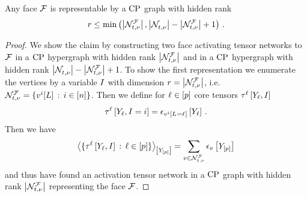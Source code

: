 \begin{lemma}
    \label{lem:CPfaceRepresentationBound} %
    Any face $\mathcal{F}$ is representable by a $\mathrm{CP}$ graph with hidden rank
    \begin{align*}
        r
        \leq \min\left(\left|\mathcal{N}_{t,\nu}^{\mathcal{F}}\right|,\left|\mathcal{N}_{t,\nu}^{}\right|-\left|\mathcal{N}_{t,\nu}^{\mathcal{F}}\right|+1\right) \, .
    \end{align*}
\end{lemma}
\begin{proof}
    We show the claim by constructing two face activating tensor networks to $\mathcal{F}$ in a $\mathrm{CP}$ hypergraph with hidden rank $\left|\mathcal{N}_{t,\nu}^{\mathcal{F}}\right|$ and in a $\mathrm{CP}$ hypergraph with hidden rank $\left|\mathcal{N}_{t,\nu}^{}\right|-\left|\mathcal{N}_{t,\nu}^{\mathcal{F}}\right|+1$.
    To show the first representation we enumerate the vertices by a variable $I$ with dimension $r=\left|\mathcal{N}_{t,\nu}^{\mathcal{F}}\right|$, i.e. $\mathcal{N}_{t,\nu}^{\mathcal{F}} = \{v^{i}[L] \,:\, i\in[n]\}$.
    Then we define for $\ell\in[p]$ core tensors $\tau^{\ell}\left[Y_{\ell},I\right]$
    \begin{align*}
        \tau^{\ell}\left[Y_{\ell},I=i\right] = \epsilon_{v^{i}\left[L_{}=\ell_{}\right]}\left[Y_{\ell}\right] \, .
    \end{align*}
    Then we have
    \begin{align*}
        \left\langle \{\tau^{\ell}\left[Y_{\ell},I\right]\,:\,\ell\in[p]\}\right\rangle_{\left[ Y_{[p]} \right]}
        =\sum_{v\in\mathcal{N}_{t,\nu}^{\mathcal{F}}} \epsilon_{v}\left[Y_{[p]}\right]
    \end{align*}
    and thus have found an activation tensor network in a $\mathrm{CP}$ graph with hidden rank $\left|\mathcal{N}_{t,\nu}^{\mathcal{F}}\right|$ representing the face $\mathcal{F}$.


\end{proof}
